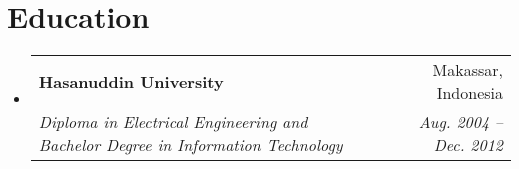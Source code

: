 \documentclass[letterpaper,13pt]{article}
\makeatletter
\newcommand{\resumeSubheading}[4]{
  \vspace{-1pt}\item
    \begin{tabular*}{0.97\textwidth}[t]{l@{\extracolsep{\fill}}r}
      \textbf{#1} & #2 \\
      \textit{\small#3} & \textit{\small #4} \\
    \end{tabular*}\vspace{-5pt}
}
\newcommand{\resumeSubHeadingListStart}{\begin{itemize}[leftmargin=*]}
\newcommand{\resumeSubHeadingListEnd}{\end{itemize}}
\makeatother
\begin{document}
\section{Education}
  \resumeSubHeadingListStart
    \resumeSubheading
      {Hasanuddin University}{Makassar, Indonesia}
      {Diploma in Electrical Engineering and Bachelor Degree in Information Technology}{Aug. 2004 -- Dec. 2012}
  \resumeSubHeadingListEnd

\end{document}
